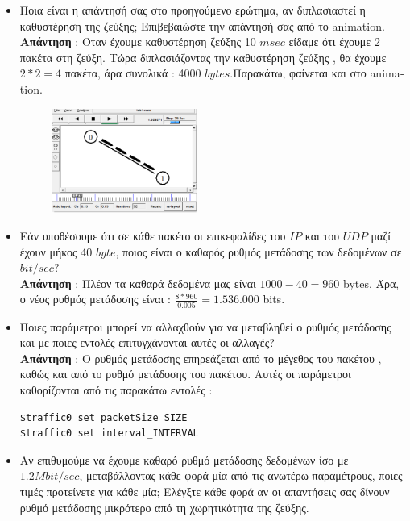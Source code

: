 \documentclass{article}%
\begin{document}
\begin{itemize}
\begin{figure}[htbp]
\end{figure}
\newpage
\item Ποια είναι η απάντησή σας στο προηγούμενο ερώτημα, αν διπλασιαστεί η καθυστέρηση της ζεύξης;
Επιβεβαιώστε την απάντησή σας από το \textlatin{animation.}\\
 \textbf{Απάντηση} : Όταν έχουμε καθυστέρηση ζεύξης 10 $msec$ είδαμε ότι έχουμε 2 πακέτα στη ζεύξη. Τώρα διπλασιάζοντας την καθυστέρηση ζεύξης , θα έχουμε $2*2=4$ πακέτα, άρα συνολικά : 4000 $bytes$.Παρακάτω, φαίνεται και στο \textlatin{animation}.
 \begin{figure}[htbp]
	 \centering
		 \includegraphics[width=0.45\textwidth]{2.png}
 \end{figure}
\item Εάν υποθέσουμε ότι σε κάθε πακέτο οι επικεφαλίδες του $IP$ και του $UDP$ μαζί έχουν μήκος 40 $byte$,
ποιος είναι ο καθαρός ρυθμός μετάδοσης των δεδομένων σε $bit/sec?$\\
\textbf{Απάντηση} : Πλέον τα καθαρά δεδομένα μας είναι $1000-40=960$ \textlatin{bytes}. Άρα, ο νέος ρυθμός μετάδοσης είναι : $\frac{8*960}{0.005}=1.536.000$ \textlatin{bits}.
\item Ποιες παράμετροι μπορεί να αλλαχθούν για να μεταβληθεί ο ρυθμός μετάδοσης και με ποιες εντολές
επιτυγχάνονται αυτές οι αλλαγές\textlatin{?}\\
\textbf{Απάντηση} : Ο ρυθμός μετάδοσης επηρεάζεται από το μέγεθος του πακέτου , καθώς και από το ρυθμό μετάδοσης του πακέτου. Αυτές οι παράμετροι καθορίζονται από τις παρακάτω εντολές : \\
\begin{lstlisting}
$traffic0 set packetSize_SIZE
$traffic0 set interval_INTERVAL 
\end{lstlisting}
\item Αν επιθυμούμε να έχουμε καθαρό ρυθμό μετάδοσης δεδομένων ίσο με $1.2 Mbit/sec$, μεταβάλλοντας
κάθε φορά μία από τις ανωτέρω παραμέτρους, ποιες τιμές προτείνετε για κάθε μία; Ελέγξτε κάθε
φορά αν οι απαντήσεις σας δίνουν ρυθμό μετάδοσης μικρότερο από τη χωρητικότητα της ζεύξης.\\

\end{itemize}
\end{document}
